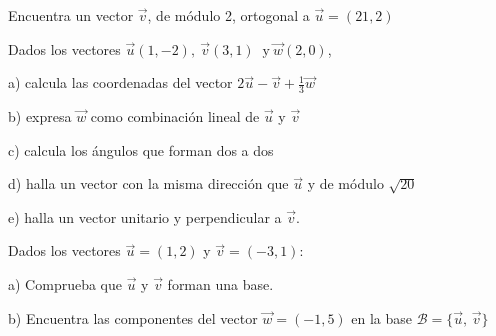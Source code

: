 \vspace{-8mm}
\begin{flushright}
\begin{footnotesize} \textcolor{gris}{}	\end{footnotesize}
\end{flushright}

\begin{mipropuesto}

Encuentra un vector $\vec v$, de módulo 2, ortogonal a $\vec u=(21, 2)$	
\end{mipropuesto}

\vspace{-8mm}
\begin{flushright}
\begin{footnotesize} \textcolor{gris}{}	\end{footnotesize}
\end{flushright}



\begin{mipropuesto}

Dados los vectores $\vec u(1,-2), \ \vec v(3, 1) \ \text { y} \ \vec w(2, 0)$,

\vspace{2mm} a) calcula las coordenadas del vector $2\vec u - \vec v +\frac 1 3 \vec  w$

b) expresa $\vec w$ como combinación lineal de $\vec u$ y $\vec v$

c) calcula los ángulos que forman dos a dos

d) halla un vector con la misma dirección que $\vec u$ y de módulo $\sqrt{20}$

e) halla un vector unitario y perpendicular a $\vec v$.	
\end{mipropuesto}


\vspace{-8mm}
\begin{flushright}
\begin{footnotesize} \textcolor{gris}{}	\end{footnotesize}
\end{flushright}


\begin{mipropuesto}

Dados los vectores $\vec u=(1, 2)$ y $\vec v=(-3, 1)$:

\vspace{2mm} a) Comprueba que $\vec u$ y $\vec v$ forman una base.

b) Encuentra las componentes del vector $\vec w =(-1, 5)$ en la base $\mathcal B = \{ \vec u,\, \vec  v \}$
\end{mipropuesto}

